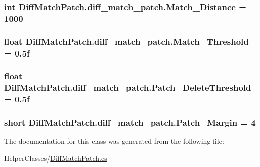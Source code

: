 \subsubsection[{Match\+\_\+\+Distance}]{\setlength{\rightskip}{0pt plus 5cm}int Diff\+Match\+Patch.\+diff\+\_\+match\+\_\+patch.\+Match\+\_\+\+Distance = 1000}\label{class_diff_match_patch_1_1diff__match__patch_a88b5300a87bcb2bde576ec8995654269}
\hypertarget{class_diff_match_patch_1_1diff__match__patch_aae494f263fa95365e8aa32aa8c2533b4}{}
\subsubsection[{Match\+\_\+\+Threshold}]{\setlength{\rightskip}{0pt plus 5cm}float Diff\+Match\+Patch.\+diff\+\_\+match\+\_\+patch.\+Match\+\_\+\+Threshold = 0.\+5f}\label{class_diff_match_patch_1_1diff__match__patch_aae494f263fa95365e8aa32aa8c2533b4}
\hypertarget{class_diff_match_patch_1_1diff__match__patch_a0594f0d0ff58f846840f79ce6403de9b}{}
\subsubsection[{Patch\+\_\+\+Delete\+Threshold}]{\setlength{\rightskip}{0pt plus 5cm}float Diff\+Match\+Patch.\+diff\+\_\+match\+\_\+patch.\+Patch\+\_\+\+Delete\+Threshold = 0.\+5f}\label{class_diff_match_patch_1_1diff__match__patch_a0594f0d0ff58f846840f79ce6403de9b}
\hypertarget{class_diff_match_patch_1_1diff__match__patch_ac534df6ede582eae0b48c8d4683b1906}{}
\subsubsection[{Patch\+\_\+\+Margin}]{\setlength{\rightskip}{0pt plus 5cm}short Diff\+Match\+Patch.\+diff\+\_\+match\+\_\+patch.\+Patch\+\_\+\+Margin = 4}\label{class_diff_match_patch_1_1diff__match__patch_ac534df6ede582eae0b48c8d4683b1906}


The documentation for this class was generated from the following file\+:\begin{DoxyCompactItemize}
\item 
Helper\+Classes/\hyperlink{_diff_match_patch_8cs}{Diff\+Match\+Patch.\+cs}\end{DoxyCompactItemize}
